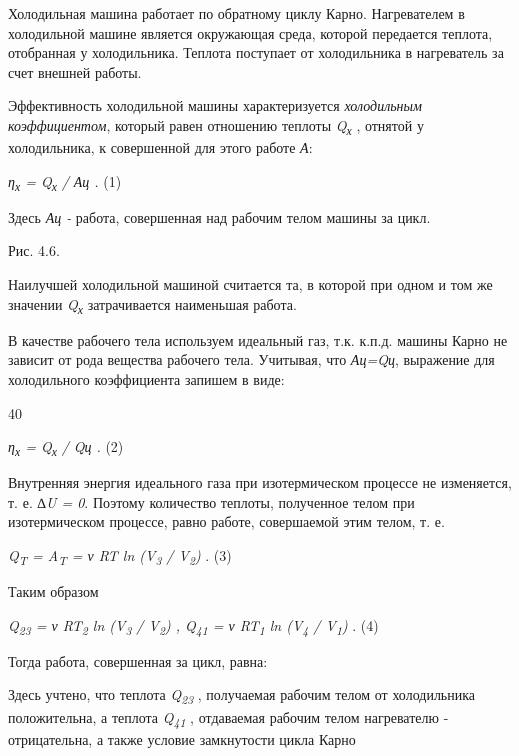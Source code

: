 Холодильная машина работает по обратному циклу Карно. Нагревателем в
холодильной машине является окружающая среда, которой передается
теплота, отобранная у холодильника. Теплота поступает от холодильника в
нагреватель за счет внешней работы.

Эффективность холодильной машины характеризуется \emph{холодильным
коэффициентом}, который равен отношению теплоты
\emph{Q\textsubscript{х}} , отнятой у холодильника, к совершенной для
этого работе \emph{А}:

\emph{η\textsubscript{х} = Q\textsubscript{х} /} \emph{Ац .} (1)

Здесь \emph{Ац -} работа, совершенная над рабочим телом машины за цикл.


Рис. 4.6.

Наилучшей холодильной машиной считается та, в которой при одном и том же
значении \emph{Q\textsubscript{х}} затрачивается наименьшая работа.

В качестве рабочего тела используем идеальный газ, т.к. к.п.д. машины
Карно не зависит от рода вещества рабочего тела. Учитывая, что
\emph{Ац=Qц}, выражение для холодильного коэффициента запишем в виде:

40

\emph{η\textsubscript{х} = Q\textsubscript{х} /} \emph{Qц .} (2)

Внутренняя энергия идеального газа при изотермическом процессе не
изменяется, т. е. \emph{∆U = 0}. Поэтому количество теплоты, полученное
телом при изотермическом процессе, равно работе, совершаемой этим телом,
т. е.

\emph{Q\textsubscript{T} = A\textsubscript{T} = ν RT ln
(V\textsubscript{3} / V\textsubscript{2})} . (3)

Таким образом

\emph{Q\textsubscript{23} = ν RT\textsubscript{2} ln (V\textsubscript{3}
/ V\textsubscript{2}) , Q\textsubscript{41} = ν RT\textsubscript{1} ln
(V\textsubscript{4} / V\textsubscript{1})} . (4)

Тогда работа, совершенная за цикл, равна:


Здесь учтено, что теплота \emph{Q\textsubscript{23}} , получаемая
рабочим телом от холодильника положительна, а теплота
\emph{Q\textsubscript{41}} , отдаваемая рабочим телом нагревателю -
отрицательна, а также условие замкнутости цикла Карно

